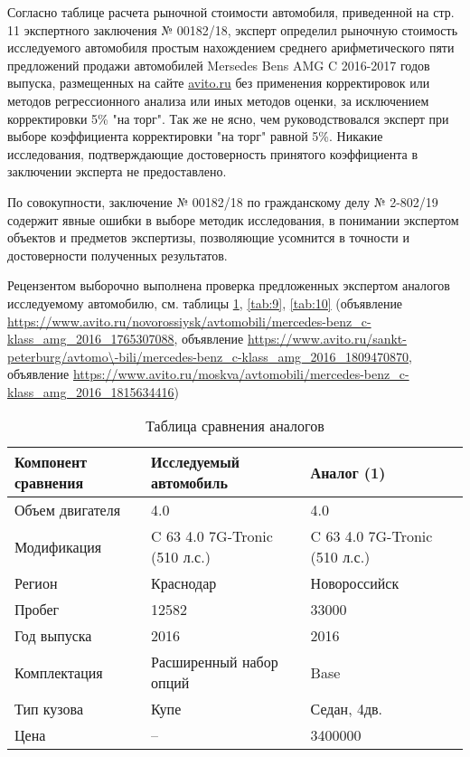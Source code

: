   
  
Согласно таблице расчета рыночной стоимости автомобиля, приведенной на стр. 11 экспертного заключения № 00182/18, эксперт определил рыночную стоимость исследуемого автомобиля простым нахождением среднего арифметического пяти предложений продажи автомобилей   Mersedes Bens AMG C  2016-2017 годов выпуска, размещенных на сайте \url {avito.ru} без применения  корректировок  или методов  регрессионного анализа или иных методов оценки, за исключением корректировки 5\% "на торг". Так же не ясно, чем руководствовался эксперт при выборе коэффициента корректировки "на торг" равной 5\%. Никакие исследования, подтверждающие достоверность принятого коэффициента в заключении эксперта не предоставлено. 
  
  
   
\par По совокупности, заключение № 00182/18 по гражданскому делу № 2-802/19  содержит явные  ошибки в выборе методик исследования, в понимании экспертом объектов и предметов экспертизы, позволяющие  усомнится в точности и достоверности полученных результатов. 
  
  
\par Рецензентом выборочно выполнена проверка предложенных экспертом аналогов исследуемому автомобилю, см. таблицы \ref{tab:8}, \ref{tab:9}, \ref{tab:10} (объявление \url{https://www.avito.ru/novorossiysk/avtomobili/mercedes-benz_c-klass_amg_2016_1765307088}, объявление \url {https://www.avito.ru/sankt-peterburg/avtomo\-bili/mercedes-benz_c-klass_amg_2016_1809470870}, объявление \url {https://www.avito.ru/moskva/avtomobili/mercedes-benz_c-klass_amg_2016_1815634416})  
 
 
\begin{longtable}{|p{51mm}|p{51mm}|p{51mm}|}
	\caption[]{\footnotesize {Таблица сравнения аналогов}} \label{tab:8}\\ 
	\hline
	\rowcolor[HTML]{EFEFEF} 
	
	Компонент сравнения & Исследуемый автомобиль& Аналог (1)  \\ \hline \endhead %
	Объем двигателя  &4.0 & 4.0 \\ \hline
	Модификация  &C 63 4.0 7G-Tronic (510 л.с.)  & C 63 4.0 7G-Tronic (510 л.с.) \\ \hline
	Регион  & Краснодар  & Новороссийск\\ \hline
	\rowcolor[HTML]{ FAEBD7} 
	Пробег & 12582   & 33000\\ \hline
	Год выпуска  & 2016  & 2016 \\ \hline
	\rowcolor[HTML]{ FAEBD7} 
	Комплектация  & Расширенный набор опций  & Base \\ \hline
	\rowcolor[HTML]{ FAEBD7} 
	Тип кузова  & Купе  & Седан, 4дв. \\ \hline
	Цена  & --  & 3400000 \\ \hline
\end{longtable}

